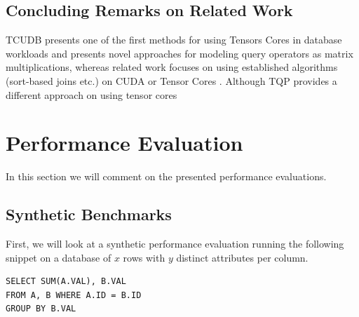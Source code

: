 \documentclass{paper}
\begin{document}
	\subsection{Concluding Remarks on Related Work}
	
	TCUDB presents one of the first methods for using Tensors Cores in database workloads and presents novel approaches for modeling query operators as matrix multiplications, whereas related work focuses on using established algorithms (sort-based joins etc.) on CUDA \cite{yuan2013yin} or Tensor Cores \cite{he2022query}. Although TQP provides a different approach on using tensor cores 
	
	\section{Performance Evaluation} \label{sec:perf_eval}
	In this section we will comment on the presented performance evaluations.

	\subsection{Synthetic Benchmarks}
	
	First, we will look at a synthetic performance evaluation running the following snippet on a database of $x$ rows with $y$ distinct attributes per column.
	\begin{verbatim}
SELECT SUM(A.VAL), B.VAL
FROM A, B WHERE A.ID = B.ID
GROUP BY B.VAL
	\end{verbatim}
\end{document}
